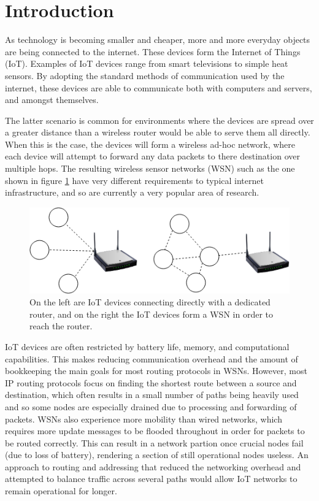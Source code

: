 \documentclass[12pt]{article}
\begin{document}
\newpage

\tableofcontents

\newpage
{}
\setcounter{page}{1} 

\section{Introduction}

As technology is becoming smaller and cheaper, more and more everyday objects are being connected to the internet. These devices form the Internet of Things (IoT). Examples of IoT devices range from smart televisions to simple heat sensors. By adopting the standard methods of communication used by the internet, these devices are able to communicate both with computers and servers, and amongst themselves. 

The latter scenario is common for environments where the devices are spread over a greater distance than a wireless router would be able to serve them all directly. When this is the case, the devices will form a wireless ad-hoc network, where each device will attempt to forward any data packets to there destination over multiple hops. The resulting wireless sensor networks (WSN) such as the one shown in figure \ref{fig:wsn}  have very different requirements to typical internet infrastructure, and so are currently a very popular area of research. 

\begin{figure}[!ht]
	\centering
	\includegraphics[width=\linewidth]{images/wsn}
	\caption{On the left are IoT devices connecting directly with a dedicated router, and on the right the IoT devices form a WSN in order to reach the router.}
	\label{fig:wsn}
\end{figure}

IoT devices are often restricted by battery life, memory, and computational capabilities. This makes reducing communication overhead and the amount of bookkeeping the main goals for most routing protocols in WSNs. However, most IP routing protocols focus on finding the shortest route between a source and destination, which often results in a small number of paths being heavily used and so some nodes are especially drained due to processing and forwarding of packets. WSNs also experience more mobility than wired networks, which requires more update messages to be flooded throughout in order for packets to be routed correctly. This can result in a network partion once crucial nodes fail (due to loss of battery), rendering a section of still operational nodes useless. An approach to routing and addressing that reduced the networking overhead and attempted to balance traffic across several paths would allow IoT networks to remain operational for longer. 
\end{document}
